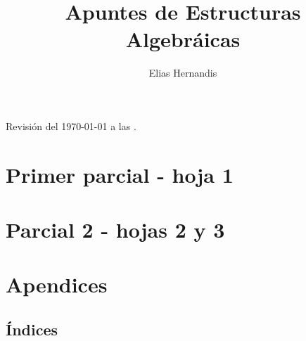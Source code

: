 \documentclass{book}
\title{Apuntes de Estructuras Algebráicas}
\author{Elias Hernandis}
\theoremstyle{definition}
\theoremstyle{remark}
\begin{document}
\maketitle
Revisión del \today $ $ a las \currenttime.

\tableofcontents

\part{Primer parcial - hoja 1}









\part{Parcial 2 - hojas 2 y 3}




\part{Apendices}

\chapter{Índices}

\renewcommand{\listtheoremname}{Lista de definiciones}
\listoftheorems[ignore={thm,ej,pro,cor,obs,lem}]

\renewcommand{\listtheoremname}{Lista de teoremas}
\listoftheorems[onlynamed,ignore={dfn,ej,pro,cor,obs,lem}]

\renewcommand{\listtheoremname}{Lista de ejemplos}
\listoftheorems[onlynamed,ignore={dfn,thm,pro,cor,obs,lem}]



\end{document}
